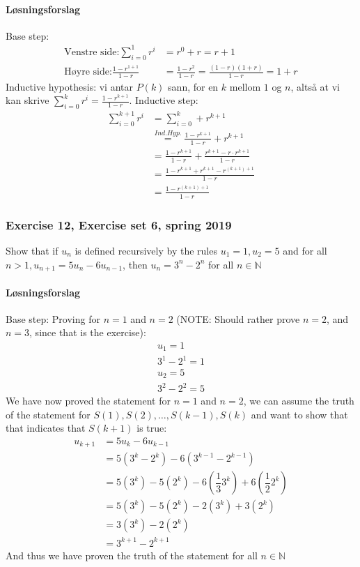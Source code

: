 \paragraph*{Løsningsforslag}
Base step: \begin{align*}
\text{Venstre side:} \sum_{i=0}^{1} r^i &= r^0+r = r+1\\
\text{Høyre side:} \frac{1-r^{1+1}}{1-r} &= \frac{1-r^2}{1-r}= \frac{(1-r)(1+r)}{1-r} = 1+r
\end{align*}
Inductive hypothesis: vi antar $P(k)$ sann, for en $k$ mellom $1$ og $n$, altså at vi kan skrive $\sum_{i=0}^{k}r^i = \frac{1-r^{k+1}}{1-r}$.
Inductive step:
\begin{align*}
    \sum_{i=0}^{k+1} r^i &= \sum_{i=0}^{k} + r^{k+1}\\
    &\overset{Ind.Hyp.}{=} \frac{1-r^{k+1}}{1-r} + r^{k+1}\\
    &= \frac{1-r^{k+1}}{1-r} + \frac{r^{k+1}-r\cdot r^{k+1}}{1-r}\\
    &= \frac{1-r^{k+1}+r^{k+1}-r^{(k+1)+1}}{1-r}\\
    &= \frac{1-r^{(k+1)+1}}{1-r}
\end{align*}


\subsubsection{Exercise 12, Exercise set 6, spring 2019}
Show that if $u_n$ is defined recursively by the 
rules $u_1 = 1,u_2 = 5$ and for all $n>1,u_{n+1}= 5u_n -6u_{n-1}$, then $u_n = 3^n - 2^n$ for all $n\in \mathbb{N}$
\paragraph*{Løsningsforslag}
Base step: Proving for $n=1$ and $n=2$ (NOTE: Should rather prove $n=2$, and $n=3$, since that is the exercise):
\begin{align*}
    u_1 = 1\\
    3^1-2^1 = 1\\
    u_2 = 5\\
    3^2-2^2 = 5
\end{align*}
We have now proved the statement for $n=1$ and $n=2$, we can assume the truth of the statement for $S(1), S(2), \dots,S(k-1), S(k)$ and want to show that that indicates that $S(k+1)$ is true:
\begin{align*}
    u_{k+1} &= 5u_{k}-6u_{k-1}\\
    &= 5(3^k-2^k)-6(3^{k-1}-2^{k-1})\\
    &= 5(3^k)-5(2^k)-6(\dfrac{1}{3}3^k)+6(\dfrac{1}{2}2^k)\\
    &= 5(3^k)-5(2^k)-2(3^k)+3(2^k)\\
    &= 3(3^k)-2(2^k)\\
    &= 3^{k+1}-2^{k+1}
\end{align*}
And thus we have proven the truth of the statement for all $n \in \mathbb{N}$

